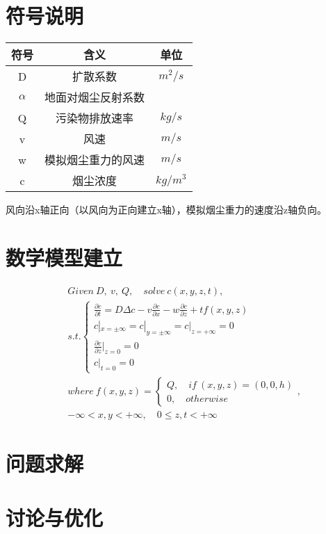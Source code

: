 \documentclass{article}
\begin{document}
	\section{符号说明}
	\begin{table}[htbp]
		\centering
		\begin{tabular}{ccc}
			\hline
			符号 & 含义 & 单位 \\
			\hline
			D & 扩散系数 & $m^2/s$ \\
            $\alpha$ & 地面对烟尘反射系数 &  \\
			Q & 污染物排放速率 & $kg/s$ \\
			v & 风速 & $m/s$ \\
            w & 模拟烟尘重力的风速 & $m/s$\\
            c & 烟尘浓度 & $kg/m^3$ \\
			\hline
		\end{tabular}
	\end{table}
	风向沿x轴正向（以风向为正向建立x轴），模拟烟尘重力的速度沿z轴负向。
	
	\section{数学模型建立}
	\begin{align*}
		&Given ~ D, ~ v, ~ Q, \quad solve ~ c(x,y,z,t),\\
		&s.t.
		\begin{cases}
			\frac{\partial c}{\partial t} = D\Delta c - v\frac{\partial c}{\partial x} - w\frac{\partial c}{\partial z} + tf(x,y,z)	\\
			c|_{x=\pm\infty}=c|_{y=\pm\infty}=c|_{z=+\infty}=0	\\
			\frac{\partial c}{\partial z}|_{z=0} = 0	\\
			c|_{t=0}=0
		\end{cases}\\
		&where  ~
		f(x,y,z) = 
		\begin{cases}
			Q, \quad if~(x, y, z)=(0, 0, h)\\
			0, \quad otherwise
		\end{cases},\\
		&-\infty<x, y<+\infty, \quad 0\leq z, t<+\infty
	\end{align*}
	
	\section{问题求解}
	
	\section{讨论与优化}
	
\end{document}
